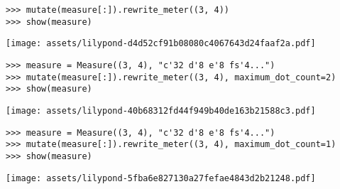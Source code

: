\begin{comment}
<abjad>
mutate(measure[:]).rewrite_meter((3, 4))
show(measure)
</abjad>
\end{comment}

\begin{singlespacing}
\vspace{-0.5\baselineskip}
\begin{lstlisting}
>>> mutate(measure[:]).rewrite_meter((3, 4))
>>> show(measure)
\end{lstlisting}
\texttt{[image: assets/lilypond-d4d52cf91b08080c4067643d24faaf2a.pdf]}
\end{singlespacing}

\begin{comment}
<abjad>
measure = Measure((3, 4), "c'32 d'8 e'8 fs'4...")
mutate(measure[:]).rewrite_meter((3, 4), maximum_dot_count=2)
show(measure)
</abjad>
\end{comment}

\begin{singlespacing}
\vspace{-0.5\baselineskip}
\begin{lstlisting}
>>> measure = Measure((3, 4), "c'32 d'8 e'8 fs'4...")
>>> mutate(measure[:]).rewrite_meter((3, 4), maximum_dot_count=2)
>>> show(measure)
\end{lstlisting}
\texttt{[image: assets/lilypond-40b68312fd44f949b40de163b21588c3.pdf]}
\end{singlespacing}

\begin{comment}
<abjad>
measure = Measure((3, 4), "c'32 d'8 e'8 fs'4...")
mutate(measure[:]).rewrite_meter((3, 4), maximum_dot_count=1)
show(measure)
</abjad>
\end{comment}

\begin{singlespacing}
\vspace{-0.5\baselineskip}
\begin{lstlisting}
>>> measure = Measure((3, 4), "c'32 d'8 e'8 fs'4...")
>>> mutate(measure[:]).rewrite_meter((3, 4), maximum_dot_count=1)
>>> show(measure)
\end{lstlisting}
\texttt{[image: assets/lilypond-5fba6e827130a27fefae4843d2b21248.pdf]}
\end{singlespacing}

\begin{comment}
<abjad>
measure = Measure((3, 4), "c'32 d'8 e'8 fs'4...")
mutate(measure[:]).rewrite_meter((3, 4), maximum_dot_count=0)
show(measure)
</abjad>
\end{comment}

